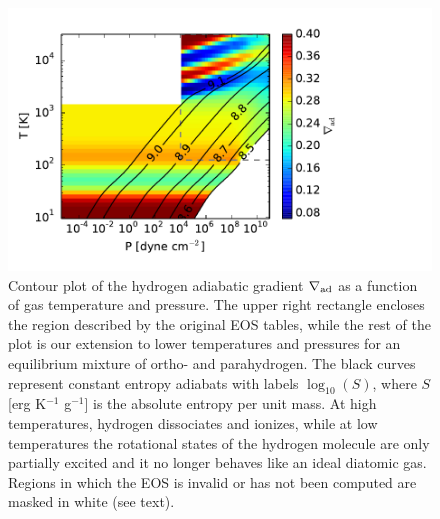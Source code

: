 \begin{enumerate}
\begin{figure}[H]
\centering
\includegraphics[scale=.7]{figures/delad_S_H.pdf}
\caption{Contour plot of the hydrogen adiabatic gradient $\nabla_{\rm ad}$ as a function of gas temperature and pressure. The upper right rectangle encloses the region described by the original \citet{saumon95} EOS tables, while the rest of the plot is our extension to lower temperatures and pressures for an equilibrium mixture of ortho- and parahydrogen. The black curves represent constant entropy adiabats with labels $\log_{10}(S)$, where $S$ [erg K$^{-1}$ g$^{-1}$] is the absolute entropy per unit mass.  At high temperatures, hydrogen dissociates and ionizes, while at low temperatures the rotational states of the hydrogen molecule are only partially excited and it no longer behaves like an ideal diatomic gas. Regions in which the EOS is invalid or has not been computed are masked in white (see text).}
\label{fig:deladH}
\end{figure}


\end{enumerate}
